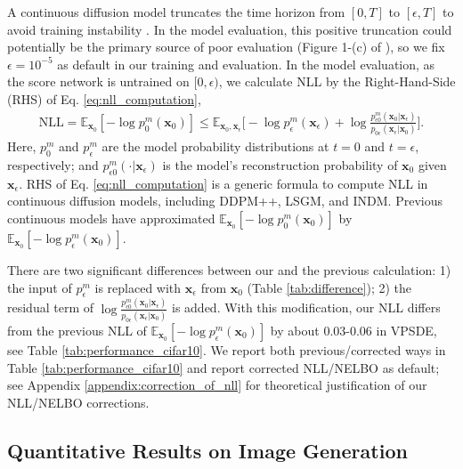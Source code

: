 \documentclass{article}
\theoremstyle{definition}
\theoremstyle{remark}
\begin{document}
	A continuous diffusion model truncates the time horizon from $[0,T]$ to $[\epsilon,T]$ to avoid training instability \cite{kim2022soft}. In the model evaluation, this positive truncation could potentially be the primary source of poor evaluation (Figure 1-(c) of \citet{kim2022soft}), so we fix $\epsilon=10^{-5}$ as default in our training and evaluation. In the model evaluation, as the score network is untrained on $[0,\epsilon)$, we calculate NLL by the Right-Hand-Side (RHS) of Eq. \eqref{eq:nll_computation},
	\begin{align}\label{eq:nll_computation}
	\text{NLL}=\mathbb{E}_{\mathbf{x}_{0}}[-\log{p_{0}^{m}(\mathbf{x}_{0})}]\le\mathbb{E}_{\mathbf{x}_{0},\mathbf{x}_{\epsilon}}\bigg[-\log{p_{\epsilon}^{m}(\mathbf{x}_{\epsilon})}+\log{\frac{p_{\epsilon 0}^{m}(\mathbf{x}_{0}\vert\mathbf{x}_{\epsilon})}{p_{0\epsilon}(\mathbf{x}_{\epsilon}\vert\mathbf{x}_{0})}}\bigg].
	\end{align}
	Here, $p_{0}^{m}$ and $p_{\epsilon}^{m}$ are the model probability distributions at $t=0$ and $t=\epsilon$, respectively; and $p_{\epsilon 0}^{m}(\cdot\vert\mathbf{x}_{\epsilon})$ is the model's reconstruction probability of $\mathbf{x}_{0}$ given $\mathbf{x}_{\epsilon}$. RHS of Eq. \eqref{eq:nll_computation} is a generic formula to compute NLL in continuous diffusion models, including DDPM++, LSGM, and INDM. Previous continuous models \cite{song2020score, song2021maximum, vahdat2021score} have approximated $\mathbb{E}_{\mathbf{x}_{0}}[-\log{p_{0}^{m}(\mathbf{x}_{0})}]$ by $\mathbb{E}_{\mathbf{x}_{0}}[-\log{p_{\epsilon}^{m}(\mathbf{x}_{0})}]$. 
	
	There are two significant differences between our and the previous calculation: 1) the input of $p_{\epsilon}^{m}$ is replaced with $\mathbf{x}_{\epsilon}$ from $\mathbf{x}_{0}$ (Table \ref{tab:difference}); 2) the residual term of $\log{\frac{p_{\epsilon 0}^{m}(\mathbf{x}_{0}\vert\mathbf{x}_{\epsilon})}{p_{0\epsilon}(\mathbf{x}_{\epsilon}\vert\mathbf{x}_{0})}}$ is added. With this modification, our NLL differs from the previous NLL of $\mathbb{E}_{\mathbf{x}_{0}}[-\log{p_{\epsilon}^{m}(\mathbf{x}_{0})}]$ by about 0.03-0.06 in VPSDE, see Table \ref{tab:performance_cifar10}. We report both previous/corrected ways in Table \ref{tab:performance_cifar10} and report corrected NLL/NELBO as default; see Appendix \ref{appendix:correction_of_nll} for theoretical justification of our NLL/NELBO corrections.
	
	\subsection{Quantitative Results on Image Generation}
	
\end{document}
